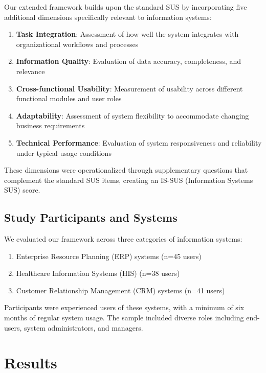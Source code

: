\documentclass[blindrev]{informs3}
\begin{document}
Our extended framework builds upon the standard SUS by incorporating five additional dimensions specifically relevant to information systems:

\begin{enumerate}
    \item \textbf{Task Integration}: Assessment of how well the system integrates with organizational workflows and processes
    \item \textbf{Information Quality}: Evaluation of data accuracy, completeness, and relevance
    \item \textbf{Cross-functional Usability}: Measurement of usability across different functional modules and user roles
    \item \textbf{Adaptability}: Assessment of system flexibility to accommodate changing business requirements
    \item \textbf{Technical Performance}: Evaluation of system responsiveness and reliability under typical usage conditions
\end{enumerate}

These dimensions were operationalized through supplementary questions that complement the standard SUS items, creating an IS-SUS (Information Systems SUS) score.

\subsection{Study Participants and Systems}\label{participants-systems}

We evaluated our framework across three categories of information systems:

\begin{enumerate}
    \item Enterprise Resource Planning (ERP) systems (n=45 users)
    \item Healthcare Information Systems (HIS) (n=38 users)
    \item Customer Relationship Management (CRM) systems (n=41 users)
\end{enumerate}

Participants were experienced users of these systems, with a minimum of six months of regular system usage. The sample included diverse roles including end-users, system administrators, and managers.

\section{Results}\label{results}
\end{document}
